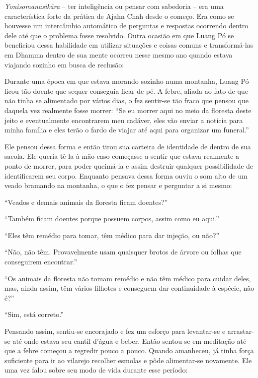 \emph{Yonisomanasikāra} -- ter inteligência ou pensar com sabedoria --
era uma característica forte da prática de Ajahn Chah desde o começo.
Era como se houvesse um intercâmbio automático de perguntas e respostas
ocorrendo dentro dele até que o problema fosse resolvido. Outra ocasião
em que Luang Pó se beneficiou dessa habilidade em utilizar situações e
coisas comuns e transformá-las em Dhamma dentro de sua mente ocorreu
nesse mesmo ano quando estava viajando sozinho em busca de reclusão:

Durante uma época em que estava morando sozinho numa montanha, Luang Pó
ficou tão doente que sequer conseguia ficar de pé. A febre, aliada ao
fato de que não tinha se alimentado por vários dias, o fez sentir-se tão
fraco que pensou que daquela vez realmente fosse morrer: ``Se eu morrer
aqui no meio da floresta deste jeito e eventualmente encontrarem meu
cadáver, eles vão enviar a notícia para minha família e eles terão o
fardo de viajar até aqui para organizar um funeral.''

Ele pensou dessa forma e então tirou sua carteira de identidade de
dentro de sua sacola. Ele queria tê-la à mão caso começasse a sentir que
estava realmente a ponto de morrer, para poder queimá-la e assim
destruir qualquer possibilidade de identificarem seu corpo. Enquanto
pensava dessa forma ouviu o som alto de um veado bramando na montanha, o
que o fez pensar e perguntar a si mesmo:

``Veados e demais animais da floresta ficam doentes?''

``Também ficam doentes porque possuem corpos, assim como eu aqui.''

``Eles têm remédio para tomar, têm médico para dar injeção, ou não?''

``Não, não têm. Provavelmente usam quaisquer brotos de árvore ou folhas
que conseguirem encontrar.''

``Os animais da floresta não tomam remédio e não têm médico para cuidar
deles, mas, ainda assim, têm vários filhotes e conseguem dar
continuidade à espécie, não é?''

``Sim, está correto.''

Pensando assim, sentiu-se encorajado e fez um esforço para levantar-se e
arrastar-se até onde estava seu cantil d'água e beber. Então sentou-se
em meditação até que a febre começou a regredir pouco a pouco. Quando
amanheceu, já tinha força suficiente para ir ao vilarejo recolher
esmolas e pôde alimentar-se novamente. Ele uma vez falou sobre seu modo
de vida durante esse período:

